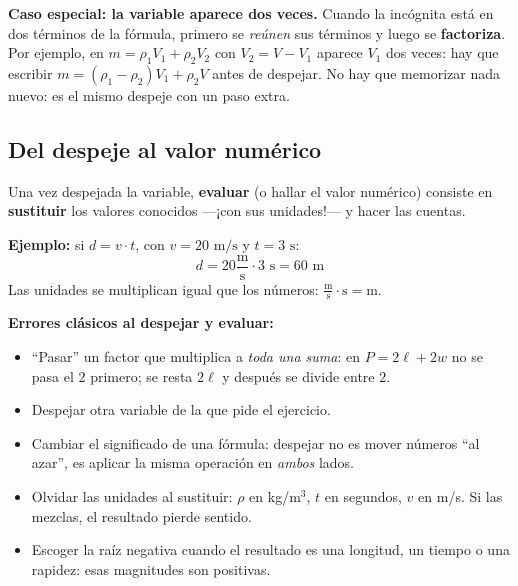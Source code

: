 \documentclass[12pt, letterpaper]{article}
\begin{document}
\begin{cuadroextra}
  \textbf{Caso especial: la variable aparece dos veces.} Cuando la incógnita está en dos términos de la fórmula, primero se \emph{reúnen} sus términos y luego se \textbf{factoriza}. Por ejemplo, en $m = \rho_1 V_1 + \rho_2 V_2$ con $V_2 = V - V_1$ aparece $V_1$ dos veces: hay que escribir $m = (\rho_1 - \rho_2)V_1 + \rho_2 V$ antes de despejar. No hay que memorizar nada nuevo: es el mismo despeje con un paso extra.
\end{cuadroextra}

\subsection{Del despeje al valor numérico}

\begin{cuadroteoria}
  Una vez despejada la variable, \textbf{evaluar} (o hallar el valor numérico) consiste en \textbf{sustituir} los valores conocidos ---¡con sus unidades!--- y hacer las cuentas.

  \textbf{Ejemplo:} si $d = v \cdot t$, con $v = 20 \text{ m/s}$ y $t = 3 \text{ s}$:
  $$d = 20 \frac{\text{m}}{\text{s}} \cdot 3 \text{ s} = 60 \text{ m}$$
  Las unidades se multiplican igual que los números: $\frac{\text{m}}{\text{s}} \cdot \text{s} = \text{m}$.
\end{cuadroteoria}

\begin{cuadroadvertencia}
  \textbf{Errores clásicos al despejar y evaluar:}
  \begin{itemize}[leftmargin=*]
    \item ``Pasar'' un factor que multiplica a \emph{toda una suma}: en $P = 2\ell + 2w$ no se pasa el $2$ primero; se resta $2\ell$ y después se divide entre $2$.
    \item Despejar otra variable de la que pide el ejercicio.
    \item Cambiar el significado de una fórmula: despejar no es mover números ``al azar'', es aplicar la misma operación en \emph{ambos} lados.
    \item Olvidar las unidades al sustituir: $\rho$ en kg/m$^3$, $t$ en segundos, $v$ en m/s. Si las mezclas, el resultado pierde sentido.
    \item Escoger la raíz negativa cuando el resultado es una longitud, un tiempo o una rapidez: esas magnitudes son positivas.
  \end{itemize}
\end{cuadroadvertencia}
\end{document}
